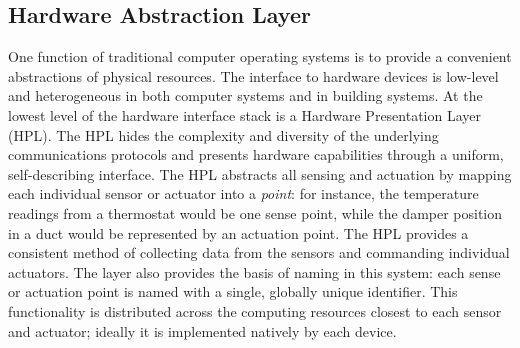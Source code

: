 
\subsection{Hardware Abstraction Layer}

One function of traditional computer operating systems is to provide a convenient abstractions of physical resources.  The interface to hardware devices is low-level and heterogeneous in both computer systems and in building systems.  At the lowest level of the hardware interface stack is a Hardware Presentation Layer (HPL).  The HPL hides the complexity and diversity of the underlying communications protocols and presents hardware capabilities through a uniform, self-describing interface.  The HPL abstracts all sensing and actuation by mapping each individual sensor or actuator into a {\it point}: for instance, the temperature readings from a thermostat would be one sense point, while the damper position in a duct would be represented by an actuation point.  The HPL provides a consistent method of collecting data from the sensors and commanding individual actuators.
The layer also provides the basis of naming in this system: each sense or actuation point is named with a single, globally unique identifier.  This functionality is distributed across the computing resources closest to each sensor and actuator; ideally it is implemented natively by each device.


 
